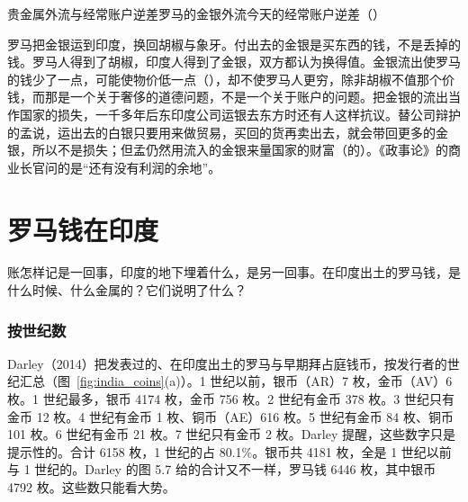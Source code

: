 \begin{compare}{贵金属外流与经常账户逆差}{罗马的金银外流}{今天的经常账户逆差（）}
\end{compare}

\begin{pitfall}
罗马把金银运到印度，换回胡椒与象牙。付出去的金银是买东西的钱，不是丢掉的钱。罗马人得到了胡椒，印度人得到了金银，双方都认为换得值。金银流出使罗马的钱少了一点，可能使物价低一点（），却不使罗马人更穷，除非胡椒不值那个价钱，而那是一个关于奢侈的道德问题，不是一个关于账户的问题。把金银的流出当作国家的损失，一千多年后东印度公司运银去东方时还有人这样抗议。替公司辩护的孟说，运出去的白银只要用来做贸易，买回的货再卖出去，就会带回更多的金银，所以不是损失；但孟仍然用流入的金银来量国家的财富（的）。《政事论》的商业长官问的是“还有没有利润的余地”。
\end{pitfall}

\section{罗马钱在印度}\label{sec:india-coins}

账怎样记是一回事，印度的地下埋着什么，是另一回事。在印度出土的罗马钱，是什么时候、什么金属的？它们说明了什么？

\subsubsection{按世纪数}
Darley（2014）把发表过的、在印度出土的罗马与早期拜占庭钱币，按发行者的世纪汇总（图~\ref{fig:india_coins}(a)）。1 世纪以前，银币（AR）7 枚，金币（AV）6 枚。1 世纪最多，银币 4174 枚，金币 756 枚。2 世纪有金币 378 枚。3 世纪只有金币 12 枚。4 世纪有金币 1 枚、铜币（AE）616 枚。5 世纪有金币 84 枚、铜币 101 枚。6 世纪有金币 21 枚。7 世纪只有金币 2 枚。Darley 提醒，这些数字只是提示性的\cite{darley2014}。合计 6158 枚，1 世纪的占 80.1\%。银币共 4181 枚，全是 1 世纪以前与 1 世纪的。Darley 的图 5.7 给的合计又不一样，罗马钱 6446 枚，其中银币 4792 枚\cite{darley2014}。这些数只能看大势。

